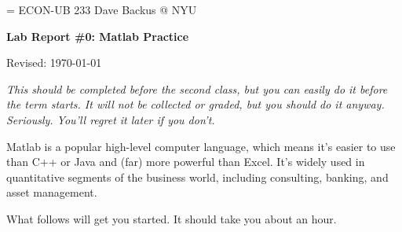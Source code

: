 \documentclass[11pt]{exam}
\begin{document}
\parskip=\bigskipamount
\parindent=0.0in
\thispagestyle{empty}
{\large ECON-UB 233 \hfill Dave Backus @ NYU}

\bigskip\bigskip
\centerline{\Large \bf Lab Report \#0:  Matlab Practice}
\centerline{Revised: \today}

\bigskip
{\it This should be completed before the second class,
but you can easily do it before the term starts.
It will not be collected or graded, but you should do it anyway.
Seriously. You'll regret it later if you don't.}

Matlab is a popular high-level computer language,
which means it's easier to use than C++ or Java
and (far) more powerful than Excel.
It's widely used in quantitative segments of the business world,
including consulting, banking, and asset management.

What follows will get you started.  It should take you about an hour.
%
\end{document}
